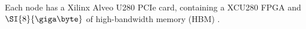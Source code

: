 
Each node has a Xilinx Alveo U280 PCIe card, containing a XCU280 FPGA and
$\SI{8}{\giga\byte}$ of high-bandwidth memory (HBM) \autocite{u280}.
